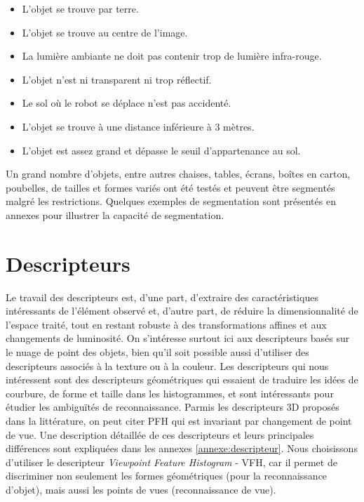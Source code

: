 \begin{itemize}
\item L'objet se trouve par terre.
\item L'objet se trouve au centre de l'image.
\item La lumière ambiante ne doit pas contenir trop de lumière infra-rouge.
\item L'objet n'est ni transparent ni trop réflectif.
\item Le sol où le robot se déplace n'est pas accidenté.
\item L'objet se trouve à une distance inférieure à 3 mètres.
\item L'objet est assez grand et dépasse le seuil d'appartenance au sol.

\end{itemize} 

Un grand nombre d'objets, entre autres chaises, tables, écrans, boîtes en carton, poubelles, de tailles et formes variés ont été testés et peuvent être segmentés malgré les restrictions. Quelques exemples de segmentation sont présentés en annexes  pour illustrer la capacité de segmentation. 

\section{Descripteurs}

Le travail des descripteurs est, d'une part, d'extraire des caractéristiques intéressants de l'élément observé et, d'autre part, de réduire la
dimensionnalité de l'espace traité, tout en restant robuste à des transformations affines et aux changements de luminosité. On s'intéresse surtout ici aux descripteurs basés sur le nuage de point des objets, bien qu'il soit possible aussi d'utiliser des descripteurs associés à la texture ou à la couleur. Les descripteurs qui nous intéressent sont des descripteurs géométriques qui essaient de traduire les idées de courbure, de forme et taille dans les histogrammes, et sont intéressants pour étudier les ambiguïtés de reconnaissance. Parmis les descripteurs 3D proposés dans la littérature, on peut citer PFH \cite{} qui est invariant par changement de point de vue.   Une description détaillée de ces descripteurs et leurs principales différences sont expliquées dans les annexes \ref{annexe:descripteur}. Nous choisissons d'utiliser le descripteur \textit{Viewpoint Feature Histogram} - VFH, car il permet de discriminer non seulement les formes géométriques (pour la reconnaissance d'objet), mais aussi les points de vues (reconnaissance de vue).

